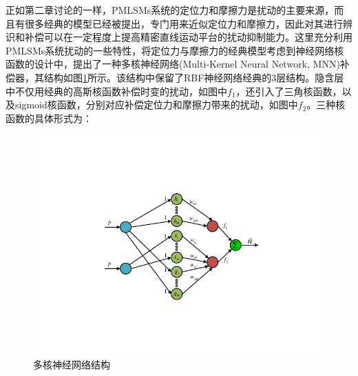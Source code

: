正如第二章讨论的一样，PMLSMs系统的定位力和摩擦力是扰动的主要来源，而且有很多经典的模型已经被提出，专门用来近似定位力和摩擦力，因此对其进行辨识和补偿可以在一定程度上提高精密直线运动平台的扰动抑制能力。这里充分利用PMLSMs系统扰动的一些特性，将定位力与摩擦力的经典模型考虑到神经网络核函数的设计中，提出了一种多核神经网络(Multi-Kernel Neural Network, MNN)补偿器，其结构如图\ref*{MNN结构}所示。该结构中保留了RBF神经网络经典的3层结构。隐含层中不仅用经典的高斯核函数补偿时变的扰动，如图中$f_1$，还引入了三角核函数，以及sigmoid核函数，分别对应补偿定位力和摩擦力带来的扰动，如图中$f_2$。三种核函数的具体形式为：
\\
\begin{figure}[H]
	\centering
	\includegraphics[width=12cm]{figures/MNN.pdf}
	\caption{多核神经网络结构}
	\label{MNN结构}
\end{figure}
